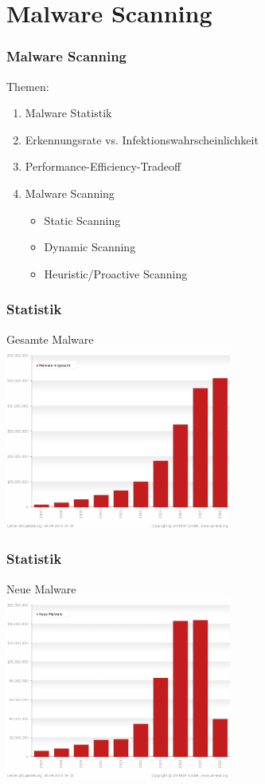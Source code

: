 \documentclass{beamer}
\begin{document}
\section{Malware Scanning}
\begin{frame}
\frametitle{Malware Scanning}

\begin{block}{Themen:}
\begin{enumerate}
\item Malware Statistik
\item Erkennungsrate vs. Infektionswahrscheinlichkeit
\item Performance-Efficiency-Tradeoff
\item Malware Scanning
\begin{itemize}
\item Static Scanning
\item Dynamic Scanning
\item Heuristic/Proactive Scanning
\end{itemize}
\end{enumerate}
\end{block}
\end{frame}

\begin{frame}
\frametitle{Statistik}
Gesamte Malware \\
\includegraphics[height=6cm]{bilder/total.png}
\end{frame}

\begin{frame}
	\frametitle{Statistik}
	Neue Malware \\
	\includegraphics[height=6cm]{bilder/growth.png}
\end{frame}
\end{document}
